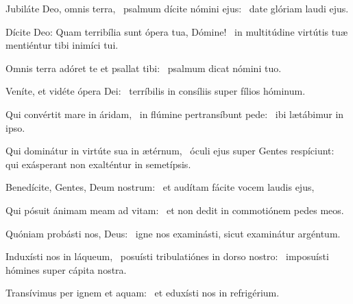 \item Jubiláte Deo, omnis terra,~\pscross{} psalmum dícite nómini ejus:~\psstar{} date glóriam laudi ejus.

\item Dícite Deo: Quam terribília sunt ópera tua, Dómine!~\psstar{} in multitúdine virtútis tuæ mentiéntur tibi inimíci tui.

\item Omnis terra adóret te et psallat tibi:~\psstar{} psalmum dicat nómini tuo.

\item Veníte, et vidéte ópera Dei:~\psstar{} terríbilis in consíliis super fílios hóminum.

\item Qui convértit mare in áridam,~\pscross{} in flúmine pertransíbunt pede:~\psstar{} ibi lætábimur in ipso.

\item Qui dominátur in virtúte sua in ætérnum,~\pscross{} óculi ejus super Gentes respíciunt:~\psstar{} qui exásperant non exalténtur in semetípsis.

\item Benedícite, Gentes, Deum nostrum:~\psstar{} et audítam fácite vocem laudis ejus,

\item Qui pósuit ánimam meam ad vitam:~\psstar{} et non dedit in commotiónem pedes meos.

\item Quóniam probásti nos, Deus:~\psstar{} igne nos examinásti, sicut examinátur argéntum.

\item Induxísti nos in láqueum,~\pscross{} posuísti tribulatiónes in dorso nostro:~\psstar{} imposuísti hómines super cápita nostra.

\item Transívimus per ignem et aquam:~\psstar{} et eduxísti nos in refrigérium.
